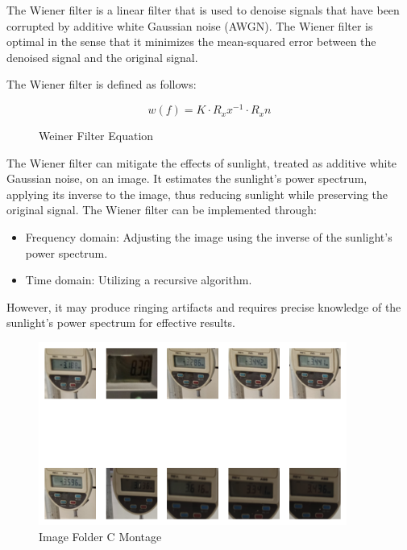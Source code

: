 The Wiener filter is a linear filter that is used to denoise signals that have been corrupted by additive white Gaussian noise (AWGN). The Wiener filter is optimal in the sense that it minimizes the mean-squared error between the denoised signal and the original signal.

The Wiener filter is defined as follows:

\begin{figure}[htbp]
    \centering
    \begin{equation}
        w(f) = K \cdot R_xx^{-1} \cdot R_xn
    \end{equation}
    \caption{Weiner Filter Equation} \cite{priyadarshiniComparativePerformanceAnalysis2022}
\end{figure}

The Wiener filter can mitigate the effects of sunlight, treated as additive white Gaussian noise, on an image. It estimates the sunlight's power spectrum, applying its inverse to the image, thus reducing sunlight while preserving the original signal. The Wiener filter can be implemented through:

\begin{itemize}
    \item Frequency domain: Adjusting the image using the inverse of the sunlight's power spectrum.
    \item Time domain: Utilizing a recursive algorithm.
\end{itemize}

However, it may produce ringing artifacts and requires precise knowledge of the sunlight's power spectrum for effective results.


\begin{figure}[ht]
    \centering
    \includegraphics[width=0.9\textwidth]{Figures/EDA_Charts/4/montage.png}
    \caption[Image Folder C Montage]{Image Folder C Montage}
    \label{fig:Image Folder C Montage}
\end{figure}

